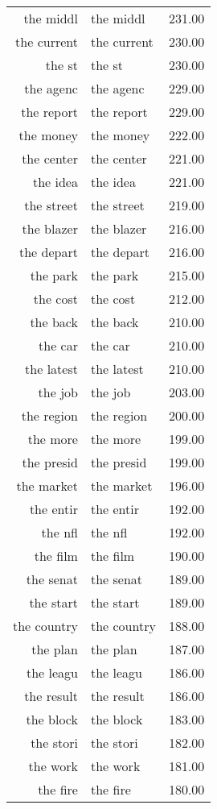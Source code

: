 \begin{table}[ht]
\begin{tabular}{rlr}
  the middl & the middl & 231.00 \\ 
  the current & the current & 230.00 \\ 
  the st & the st & 230.00 \\ 
  the agenc & the agenc & 229.00 \\ 
  the report & the report & 229.00 \\ 
  the money & the money & 222.00 \\ 
  the center & the center & 221.00 \\ 
  the idea & the idea & 221.00 \\ 
  the street & the street & 219.00 \\ 
  the blazer & the blazer & 216.00 \\ 
  the depart & the depart & 216.00 \\ 
  the park & the park & 215.00 \\ 
  the cost & the cost & 212.00 \\ 
  the back & the back & 210.00 \\ 
  the car & the car & 210.00 \\ 
  the latest & the latest & 210.00 \\ 
  the job & the job & 203.00 \\ 
  the region & the region & 200.00 \\ 
  the more & the more & 199.00 \\ 
  the presid & the presid & 199.00 \\ 
  the market & the market & 196.00 \\ 
  the entir & the entir & 192.00 \\ 
  the nfl & the nfl & 192.00 \\ 
  the film & the film & 190.00 \\ 
  the senat & the senat & 189.00 \\ 
  the start & the start & 189.00 \\ 
  the country & the country & 188.00 \\ 
  the plan & the plan & 187.00 \\ 
  the leagu & the leagu & 186.00 \\ 
  the result & the result & 186.00 \\ 
  the block & the block & 183.00 \\ 
  the stori & the stori & 182.00 \\ 
  the work & the work & 181.00 \\ 
  the fire & the fire & 180.00 \\ 

\end{tabular}
\end{table}
